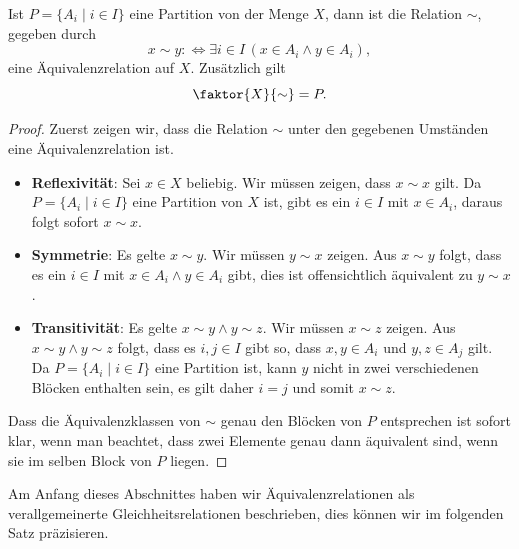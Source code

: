     \begin{satz}
    Ist $P=\{A_i\mid i\in I\}$ eine Partition von der Menge $X$, dann ist die Relation $\sim$, gegeben durch
    \[
    x\sim y:\Leftrightarrow \exists i\in I\,(x\in A_i\land y\in A_i),
    \]
    eine Äquivalenzrelation auf $X$. Zusätzlich gilt
    \[
    \faktor{X}{\sim}=P.
    \]
    \end{satz}
    \begin{proof}
    Zuerst zeigen wir, dass die Relation $\sim$ unter den gegebenen Umständen eine Äquivalenzrelation ist.
    \begin{itemize}
    \item \textbf{Reflexivität}: Sei $x\in X$  beliebig. Wir müssen zeigen, dass $x\sim x$ gilt. Da $P=\{A_i\mid i\in I\}$ eine Partition von $X$ ist, gibt es ein $i\in I$ mit $x\in A_i$, daraus folgt sofort $x\sim x$.
    \item \textbf{Symmetrie}: Es gelte $x\sim y$. Wir müssen $y\sim x$ zeigen. Aus $x\sim y$ folgt, dass es ein $i\in I$ mit $x\in A_i\land y\in A_i$ gibt, dies ist offensichtlich äquivalent zu $y\sim x$.
    \item \textbf{Transitivität}: Es gelte $x\sim y\land y\sim z$. Wir müssen $x\sim z$ zeigen. Aus $x\sim y\land y\sim z$ folgt, dass es $i,j\in I$ gibt so, dass $x,y\in A_i$ und $y,z\in A_j$ gilt. Da $P=\{A_i\mid i\in I\}$ eine Partition ist, kann $y $ nicht in zwei verschiedenen Blöcken enthalten sein, es gilt daher $i=j$ und somit $x\sim z$.
    \end{itemize}
    Dass die Äquivalenzklassen von $\sim$ genau den Blöcken von $P$ entsprechen ist sofort klar, wenn man beachtet, dass zwei Elemente genau dann äquivalent sind, wenn sie im selben Block von $P$ liegen.
    \end{proof}

    Am Anfang dieses Abschnittes haben wir Äquivalenzrelationen als verallgemeinerte Gleichheitsrelationen beschrieben, dies können wir im folgenden Satz präzisieren.

